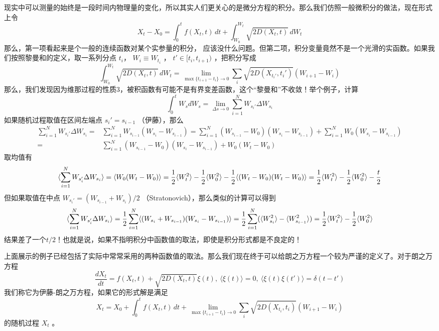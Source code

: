 \documentclass{ctexart}
\newcommand\non{\nonumber \\}
\begin{document}
现实中可以测量的始终是一段时间内物理量的变化，所以其实人们更关心的是微分方程的积分。那么我们仿照一般微积分的做法，现在形式上令
\begin{equation}
X_t-X_0=\int_0^t f(X_t,t)\, dt+\int_{W_0}^{W_t}\sqrt{2D(X_t,t)}\,dW_t
\end{equation}
那么，第一项看起来是个一般的连续函数对某个实参量的积分， 应该没什么问题。但第二项，积分变量竟然不是一个光滑的实函数。如果我们按照黎曼和的定义，取一系列分点 $t_i$， $W_i\equiv W_{t_i}$ ， $t'\in[t_i,t_{i+1})$ ，把积分写成
\begin{equation}
\int_{W_0}^{W_t}\sqrt{2D(X_t,t)}\, dW_t=\lim_{\max\{t_{i+1}-t_i\}\to 0}\sum_i\sqrt{2D(X_{t_i'},t_i')}(W_{i+1}-W_i)
\end{equation}
那么，我们发现因为维那过程的性质3，被积函数有可能不是有界变差函数，这个“黎曼和”不收敛！举个例子，计算
\begin{equation}
\int_0^t W_s dW_s=\lim_{\Delta s\to0}\sum_{i=1}^N W_{s_i'}\Delta W_{s_i}
\end{equation}
如果随机过程取值在区间左端点 $s_i'=s_{i-1}$ （伊藤），那么
\begin{align}
\sum_{i=1}^N W_{s_i'}\Delta W_{s_i}=&\sum_{i=1}^N W_{s_{i-1}}(W_{s_i}-W_{s_{i-1}})=\sum_{i=1}^N (W_{s_{i-1}}-W_0)(W_{s_i}-W_{s_{i-1}})+\sum_{i=1}^N W_0(W_{s_i}-W_{s_{i-1}}) \non
 =&\sum_{i=1}^N (W_{s_{i-1}}-W_0)(W_{s_i}-W_{s_{i-1}})+W_0(W_{t}-W_{0})
\end{align}
取均值有
\begin{equation}
\langle\sum_{i=1}^N W_{s_i'}\Delta W_{s_i}\rangle=\langle W_0(W_{t}-W_{0})\rangle=\frac{1}{2}\langle W_t^2\rangle-\frac{1}{2}\langle W_0^2\rangle-\frac{1}{2}\langle (W_t-W_0)(W_{t}-W_{0})\rangle \\ =\frac{1}{2}\langle W_t^2\rangle-\frac{1}{2}\langle W_0^2\rangle-\frac{t}{2}
\end{equation}
但如果取值在中点 $W_{s_i'}=(W_{s_{i-1}}+W_{s_i})/2$ （Stratonovich），那么类似的计算可以得到
\begin{equation}
\langle\sum_{i=1}^N W_{s_i'}\Delta W_{s_i}\rangle=\frac{1}{2}\sum_{i=1}^N\langle(W_{s_i}+W_{s_{i-1}})(W_{s_i}-W_{s_{i-1}})\rangle=\frac{1}{2}\sum_{i=1}^N(\langle W_{s_i}^2\rangle-\langle W^2_{s_{i-1}}\rangle) \\ =\frac{1}{2}\langle W_t^2\rangle-\frac{1}{2}\langle W_0^2\rangle
\end{equation}
结果差了一个$t/2$！也就是说，如果不指明积分中函数值的取法，即使是积分形式都是不良定的！

上面展示的例子已经包括了实际中常常采用的两种函数值的取法。那么我们现在终于可以给朗之万方程一个较为严谨的定义了。对于朗之万方程
\begin{equation}
\frac{dX_t}{dt}=f(X_t,t)+\sqrt{2D(X_t,t)}\xi(t),\ \langle\xi(t)\rangle=0,\ \langle\xi(t)\xi(t')\rangle=\delta(t-t')
\end{equation}
我们称它为伊藤-朗之万方程，如果它的形式解是满足
\begin{equation}
X_t=X_0+\int_0^t f(X_t,t)\, dt+\lim_{\max\{t_{i+1}-t_i\}\to 0}\sum_i\sqrt{2D(X_{t_i},t_i)}(W_{i+1}-W_i)
\end{equation}
的随机过程 $X_t$ 。
\end{document}

